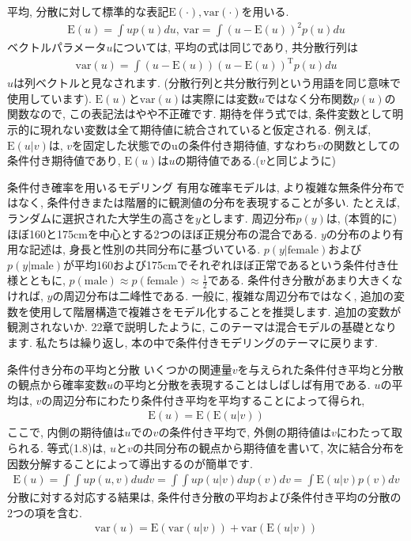 \documentclass[10pt,dvipdfmx,a4]{beamer}
\newcommand{\eq}[1]{\begin{align}#1\end{align}}
\newcommand{\eqn}[1]{\begin{align*}#1\end{align*}}
\begin{document}
\begin{frame}
平均, 分散に対して標準的な表記$\text{E}(\cdot), \text{var}(\cdot)$を用いる.
\eqn{\text{E}(u)=\int u p(u)du,\ \text{var}=\int (u-\text{E}(u))^2 p(u)du}
ベクトルパラメータ$u$については, 平均の式は同じであり, 共分散行列は
\eqn{\text{var}(u)=\int (u-\text{E}(u))(u-\text{E}(u))^{\mathrm{T}}p(u)du}
$u$は列ベクトルと見なされます.
(分散行列と共分散行列という用語を同じ意味で使用しています).
$\text{E}(u)$と$\text{var}(u)$は実際には変数$u$ではなく分布関数$p(u)$の関数なので, この表記法はやや不正確です.
期待を伴う式では, 条件変数として明示的に現れない変数は全て期待値に統合されていると仮定される.
例えば, $\text{E}(u|v)$は, $v$を固定した状態でのuの条件付き期待値, すなわち$v$の関数としての条件付き期待値であり, $\text{E}(u)$は$u$の期待値である.($v$と同じように)
\end{frame}


\begin{frame}{条件付き確率を用いるモデリング}
有用な確率モデルは, より複雑な無条件分布ではなく, 条件付きまたは階層的に観測値の分布を表現することが多い.
たとえば, ランダムに選択された大学生の高さを$y$とします.
周辺分布$p(y)$は, (本質的に)ほぼ160と175cmを中心とする2つのほぼ正規分布の混合である.
$y$の分布のより有用な記述は, 身長と性別の共同分布に基づいている.
$p(y|\text{female})$および$p(y|\text{male})$が平均160および175cmでそれぞれほぼ正常であるという条件付き仕様とともに, $p(\text{male})\approx p(\text{female})\approx \tfrac{1}{2}$である.
条件付き分散があまり大きくなければ, $y$の周辺分布は二峰性である.
一般に, 複雑な周辺分布ではなく, 追加の変数を使用して階層構造で複雑さをモデル化することを推奨します.
追加の変数が観測されないか.
22章で説明したように, このテーマは混合モデルの基礎となります.
私たちは繰り返し, 本の中で条件付きモデリングのテーマに戻ります.
\end{frame}


\begin{frame}{条件付き分布の平均と分散}
いくつかの関連量$v$を与えられた条件付き平均と分散の観点から確率変数$u$の平均と分散を表現することはしばしば有用である.
$u$の平均は, $v$の周辺分布にわたり条件付き平均を平均することによって得られ,
\eq{\text{E}(u)=\text{E}(\text{E}(u|v))}
ここで, 内側の期待値は$u$での$v$の条件付き平均で, 外側の期待値は$v$にわたって取られる.
等式(1.8)は, $u$と$v$の共同分布の観点から期待値を書いて, 次に結合分布を因数分解することによって導出するのが簡単です.
\eqn{\text{E}(u)=\int \int u p(u,v)dudv=\int \int up(u|v)dup(v)dv=\int\text{E}(u|v)p(v)dv}
分散に対する対応する結果は, 条件付き分散の平均および条件付き平均の分散の2つの項を含む.
\eq{\text{var}(u)=\text{E}(\text{var}(u|v))+\text{var}(\text{E}(u|v))}
\end{frame}
\end{document}
